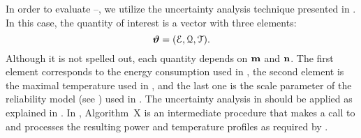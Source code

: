 In order to evaluate --, we utilize the uncertainty analysis technique presented in .
In this case, the quantity of interest is a vector with three elements:
\begin{equation} \elab{quantity-of-interest}
  \vw = (\qoiE, \qoiQ, \qoiT).
\end{equation}
Although it is not spelled out, each quantity depends on $\mathbf{m}$ and $\mathbf{n}$.
The first element corresponds to the energy consumption used in , the second element is the maximal temperature used in , and the last one is the scale parameter of the reliability model (see ) used in .
The uncertainty analysis in  should be applied as explained in .
In , Algorithm~X is an intermediate procedure that makes a call to  and processes the resulting power and temperature profiles as required by .
